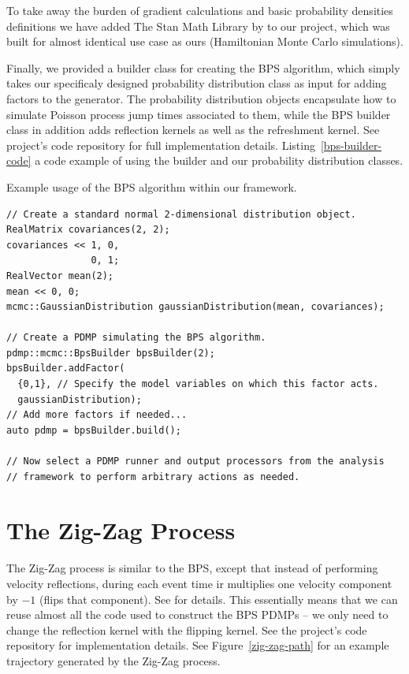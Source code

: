 \documentclass[report.tex]{subfiles}
\begin{document}
To take away the burden of gradient calculations and basic probability densities definitions
we have added The Stan Math Library by \citet{carpenter2015stan} to our project, which was
built for almost identical use case as ours (Hamiltonian Monte Carlo simulations).

Finally, we provided a builder class for creating the BPS algorithm, which simply takes
our specificaly designed probability distribution class as input for adding factors to the generator.
The probability distribution objects encapsulate how to simulate Poisson process jump times
associated to them, while the BPS builder class in addition adds reflection kernels as well
as the refreshment kernel.
See project's code repository for full implementation details.
Listing~\ref{bps-builder-code} a code example of using the builder and our probability
distribution classes.

\begin{lstfloat}
\caption{Example usage of the BPS algorithm within our framework.}
\label{bps-builder-code}
\begin{lstlisting}
// Create a standard normal 2-dimensional distribution object.
RealMatrix covariances(2, 2);
covariances << 1, 0,
               0, 1;
RealVector mean(2);
mean << 0, 0;
mcmc::GaussianDistribution gaussianDistribution(mean, covariances);

// Create a PDMP simulating the BPS algorithm.
pdmp::mcmc::BpsBuilder bpsBuilder(2);
bpsBuilder.addFactor(
  {0,1}, // Specify the model variables on which this factor acts.
  gaussianDistribution);
// Add more factors if needed...
auto pdmp = bpsBuilder.build();

// Now select a PDMP runner and output processors from the analysis
// framework to perform arbitrary actions as needed.
\end{lstlisting}
\end{lstfloat}

\section{The Zig-Zag Process}

The Zig-Zag process is similar to the BPS, except that instead of performing
velocity reflections, during each event time ir multiplies one velocity component
by $-1$ (flips that component). See \citet{bierkens2016zig} for details.
This essentially means that we can reuse almost all the code used to construct
the BPS PDMPs -- we only need to change the reflection kernel with the flipping
kernel. See the project's code repository for implementation details.
See Figure~\ref{zig-zag-path} for an example trajectory generated by the Zig-Zag process.
\end{document}
